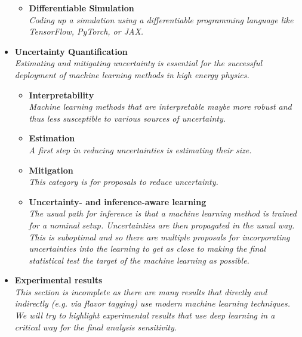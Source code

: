 \documentclass[12pt,letterpaper]{article}
\begin{document}
\begin{itemize}
\begin{itemize}
		\item \textbf{Differentiable Simulation}~\cite{Heinrich:2022xfa,Nachman:2022jbj,Lei:2022dvn,Napolitano:2023jhg}
		\\\textit{Coding up a simulation using a differentiable programming language like TensorFlow, PyTorch, or JAX.}
	\end{itemize}
\item \textbf{Uncertainty Quantification}
\\\textit{Estimating and mitigating uncertainty is essential for the successful deployment of machine learning methods in high energy physics. }
	\begin{itemize}
		\item \textbf{Interpretability}~\cite{deOliveira:2015xxd,Chang:2017kvc,Diefenbacher:2019ezd,Agarwal:2020fpt,Grojean:2020ech,Romero:2021qlf,Collins:2021pld,Mokhtar:2021bkf,Bradshaw:2022qev,Anzalone:2022hrt,Grojean:2022mef,Khot:2022aky}
		\\\textit{Machine learning methods that are interpretable maybe more robust and thus less susceptible to various sources of uncertainty.}
		\item \textbf{Estimation}~\cite{Nachman:2019dol,Nachman:2019yfl,Barnard:2016qma,Bellagente:2021yyh,Cheung:2022dil}
		\\\textit{A first step in reducing uncertainties is estimating their size.}
		\item \textbf{Mitigation}~\cite{Estrade:DLPS2017,Englert:2018cfo,Louppe:2016ylz,Araz:2021wqm,Stein:2022nvf}
		\\\textit{This category is for proposals to reduce uncertainty.}
		\item \textbf{Uncertainty- and inference-aware learning}~\cite{Caron:2019xkx,Bollweg:2019skg,deCastro:2018mgh,Wunsch:2020iuh,Ghosh:2021roe,Abudinen:2021qpc,Simpson:2022suz}
		\\\textit{The usual path for inference is that a machine learning method is trained for a nominal setup.  Uncertainties are then propagated in the usual way.  This is suboptimal and so there  are multiple proposals for incorporating uncertainties into the learning to get as close to making the final statistical test the target of the machine learning as possible.}
	\end{itemize}
\item \textbf{Experimental results}
\\\textit{This section is incomplete as there are many results that directly and indirectly (e.g. via flavor tagging) use modern machine learning techniques.  We will try to highlight experimental results that use deep learning in a critical way for the final analysis sensitivity.}

\end{itemize}
\end{document}
